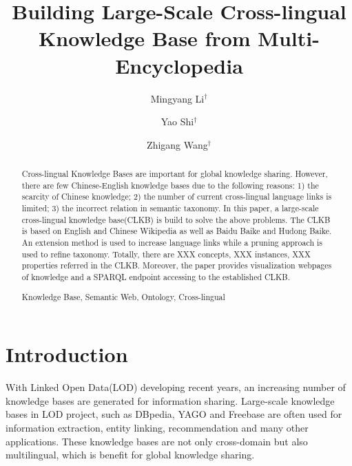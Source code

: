 \documentclass[runningheads,a4paper]{llncs}
\newcommand{\keywords}[1]{\par\addvspace\baselineskip\noindent\keywordname\enspace\ignorespaces#1}
\begin{document}
\mainmatter

\title{Building Large-Scale Cross-lingual Knowledge Base from Multi-Encyclopedia}
\author{Mingyang Li$^\dag$ \and Yao Shi$^\dag$ \and Zhigang Wang$^\dag$}


\maketitle

\begin{abstract}
Cross-lingual Knowledge Bases are important for global knowledge sharing. However, there are few Chinese-English knowledge bases due to the following reasons: 1) the scarcity of Chinese knowledge; 2) the number of current cross-lingual language links is limited; 3) the incorrect relation in semantic taxonomy. In this paper, a large-scale cross-lingual knowledge base(CLKB) is build to solve the above problems. The CLKB is based on English and Chinese Wikipedia as well as Baidu Baike and Hudong Baike. An extension method is used to increase language links while a pruning approach is used to refine taxonomy. Totally, there are XXX concepts, XXX instances, XXX properties referred in the CLKB. Moreover, the paper provides visualization webpages of knowledge and a SPARQL endpoint accessing to the established CLKB.  

\keywords{Knowledge Base, Semantic Web, Ontology, Cross-lingual}
\end{abstract}

\section{Introduction}
With Linked Open Data(LOD) developing recent years, an increasing number of knowledge bases are generated for information sharing. Large-scale knowledge bases in LOD project, such as DBpedia\cite{mendes2012dbpedia}, YAGO\cite{mahdisoltani2014yago3} and Freebase\cite{bollacker2008freebase} are often used for information extraction\cite{dutta2013integrating}, entity linking\cite{shen2012linden}, recommendation\cite{passant2010dbrec,fernandez2011generic,kaminskas2012knowledge} and many other applications. These knowledge bases are not only cross-domain but also multilingual, which is benefit for global knowledge sharing.  
\end{document}
